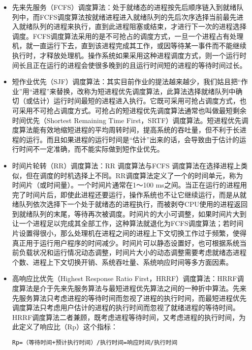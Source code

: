 \begin{itemize}
\item
  先来先服务（FCFS）调度算法：处于就绪态的进程按先后顺序链入到就绪队列中，而FCFS调度算法按就绪进程进入就绪队列的先后次序选择当前最先进入就绪队列的进程来执行，直到此进程阻塞或结束，才进行下一次的进程选择调度。FCFS调度算法采用的是不可抢占的调度方式，一旦一个进程占有处理机，就一直运行下去，直到该进程完成其工作，或因等待某一事件而不能继续执行时，才释放处理机。操作系统如果采用这种进程调度方式，则一个运行时间长且正在运行的进程会使很多晚到的且运行时间短的进程的等待时间过长。
\item
  短作业优先（SJF）调度算法：其实目前作业的提法越来越少，我们姑且把``作业''用``进程''来替换，改称为短进程优先调度算法，此算法选择就绪队列中确切（或估计）运行时间最短的进程进入执行。它既可采用可抢占调度方式，也可采用不可抢占调度方式。可抢占的短进程优先调度算法通常也叫做最短剩余时间优先（Shortest
  Remaining Time
  First，SRTF）调度算法。短进程优先调度算法能有效地缩短进程的平均周转时间，提高系统的吞吐量，但不利于长进程的运行。而且如果进程的运行时间是``估计''出来的话，会导致由于估计的运行时间不一定准确，而不能实际做到短作业优先。
\item
  时间片轮转（RR）调度算法：RR 调度算法与FCFS
  调度算法在选择进程上类似，但在调度的时机选择上不同。RR调度算法定义了一个的时间单元，称为时间片（或时间量）。一个时间片通常在1～100
  ms之间。当正在运行的进程用完了时间片后，即使此进程还要运行，操作系统也不让它继续运行，而是从就绪队列依次选择下一个处于就绪态的进程执行，而被剥夺CPU使用的进程返回到就绪队列的末尾，等待再次被调度。时间片的大小可调整，如果时间片大到让一个进程足以完成其全部工作，这种算法就退化为FCFS调度算法；若时间片设置得很小，那么处理机在进程之间的进程上下文切换工作过于频繁，使得真正用于运行用户程序的时间减少。时间片可以静态设置好，也可根据系统当前负载状况和运行情况动态调整，时间片大小的动态调整需要考虑就绪态进程个数、进程上下文切换开销、系统吞吐量、系统响应时间等多方面因素。
\item
  高响应比优先（Highest Response Ratio
  First，HRRF）调度算法：HRRF调度算法是介于先来先服务算法与最短进程优先算法之间的一种折中算法。先来先服务算法只考虑进程的等待时间而忽视了进程的执行时间，而最短进程优先调度算法只考虑用户估计的进程的执行时间而忽视了就绪进程的等待时间。HRRF调度算法二者兼顾，既考虑进程等待时间，又考虑进程的执行时间，为此定义了响应比（Rp）这个指标：

\begin{lstlisting}
Rp=（等待时间+预计执行时间）/执行时间=响应时间/执行时间
\end{lstlisting}


\end{itemize}
